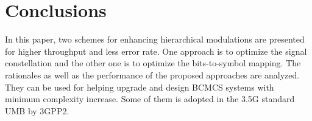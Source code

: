 \documentclass[10pt,fleqn, twocolumn]{IEEEtran}
\begin{document}
\section{Conclusions}
In this paper, two schemes for enhancing hierarchical modulations
are presented for higher throughput and less error rate. One
approach is to optimize the signal constellation and the other one
is to optimize the bits-to-symbol mapping. The rationales as well
as the performance of the proposed approaches are analyzed. They
can be used for helping upgrade and design BCMCS systems with
minimum complexity increase. Some of them is adopted in the 3.5G
standard UMB by 3GPP2. \small


\end{document}
